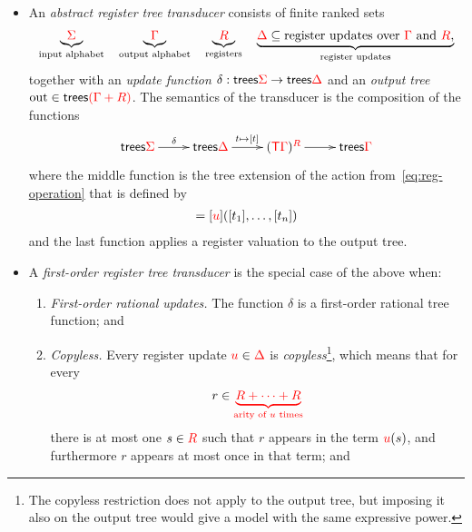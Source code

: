 \begin{definition}\label{def:stt}
\ 
    \begin{itemize}
        \item An  \emph{abstract register tree transducer} consists of finite ranked sets
        \begin{align*}
           \underbrace{{\color{red}{\Sigma}}}_{\text{input alphabet}} \quad 
           \underbrace{{\color{red}{\Gamma}}}_{\text{output alphabet}} \quad 
           \underbrace{{\color{red}{R}}}_{\text{registers}} \quad 
           \underbrace{{\color{red}{\Delta}} \subseteq \text{register updates over ${\color{red}{\Gamma}}$ and ${\color{red}{R}}$},}_{\text{register updates}}
        \end{align*}
           together with an \emph{update function} $\delta : \mathsf {trees} {\color{red}{\Sigma}} \to \mathsf {trees} {\color{red}{\Delta}}$ and an \emph{output tree} $\mathrm{out} \in \mathsf {trees} {\color{red}{(\Gamma + R)}}$. 
           The semantics of the transducer is the composition of the functions
    \begin{align*}
        \xymatrix{
            \trees \rSigma \ar[r]^{\delta} & \trees \rDelta \ar[r]^{t \mapsto [t]} & (\tmonad \rGamma)^\regnames \ar[r]& \trees \rGamma
        }
    \end{align*}
    where the middle function is the tree extension of the action from~\eqref{eq:reg-operation} that is defined by 
    \begin{align*}
        [\ranked u \tensorpair{t_1,\ldots,t_n}] = [\ranked u]([t_1],\ldots,[t_n])
    \end{align*}
    and the last function applies a register valuation to the output tree. 
    \item A \emph{first-order register tree transducer} is the special case of the above when:
    \begin{enumerate}
        \item \emph{First-order rational updates.} The function $\delta$ is a first-order rational tree function; and
        \item \emph{Copyless.} Every register update ${\color{red}{u}} \in {\color{red}{\Delta}}$ is \emph{copyless}\footnote{The copyless restriction does not apply to the output tree, but imposing it also on the output tree would give a model with the same expressive power.}, which means that for every
        \begin{align*}
            r \in {\color{red}{\underbrace{{{\color{red}{R}}}+ \cdots + {{\color{red}{R}}}}_{\text{arity of $u$ times}}}}
        \end{align*}
        there is at most one $s \in {{\color{red}{R}}}$ such that $r$ appears in the term  ${\color{red}{u}}(s)$, and furthermore $r$ appears at most once in that term; and 

\end{enumerate}
\end{itemize}
\end{definition}
